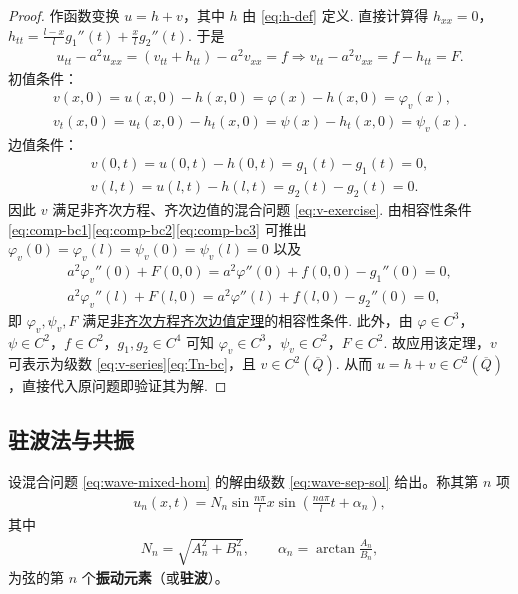 \documentclass[../../main.tex]{subfiles}%
\begin{document}
\begin{proof}
作函数变换 $u=h+v$，其中 $h$ 由 \eqref{eq:h-def} 定义. 直接计算得 $h_{xx}=0$，$h_{tt}=\frac{l-x}{l}g_1''(t)+\frac{x}{l}g_2''(t)$. 于是
\begin{align*}
u_{tt}-a^2u_{xx}=(v_{tt}+h_{tt})-a^2v_{xx}=f
\Longrightarrow v_{tt}-a^2v_{xx}=f-h_{tt}=F.
\end{align*}
初值条件：
\begin{align*}
v(x,0)=u(x,0)-h(x,0)=\varphi(x)-h(x,0)=\varphi_v(x),\\
v_t(x,0)=u_t(x,0)-h_t(x,0)=\psi(x)-h_t(x,0)=\psi_v(x).
\end{align*}
边值条件：
\begin{align*}
v(0,t)=u(0,t)-h(0,t)=g_1(t)-g_1(t)=0,\\
v(l,t)=u(l,t)-h(l,t)=g_2(t)-g_2(t)=0.
\end{align*}
因此 $v$ 满足非齐次方程、齐次边值的混合问题 \eqref{eq:v-exercise}. 由相容性条件 \eqref{eq:comp-bc1}\eqref{eq:comp-bc2}\eqref{eq:comp-bc3} 可推出 $\varphi_v(0)=\varphi_v(l)=\psi_v(0)=\psi_v(l)=0$ 以及
\begin{align*}
a^2\varphi_v''(0)+F(0,0)=a^2\varphi''(0)+f(0,0)-g_1''(0)=0,\\
a^2\varphi_v''(l)+F(l,0)=a^2\varphi''(l)+f(l,0)-g_2''(0)=0,
\end{align*}
即 $\varphi_v,\psi_v,F$ 满足\hyperref[theorem:一维波动方程的混合问题非齐次方程、齐次边值情形的解]{非齐次方程齐次边值定理}的相容性条件. 此外，由 $\varphi\in C^3$，$\psi\in C^2$，$f\in C^2$，$g_1,g_2\in C^4$ 可知 $\varphi_v\in C^3$，$\psi_v\in C^2$，$F\in C^2$. 故应用该定理，$v$ 可表示为级数 \eqref{eq:v-series}\eqref{eq:Tn-bc}，且 $v\in C^2(\overline{Q})$. 从而 $u=h+v\in C^2(\overline{Q})$，直接代入原问题即验证其为解.
\end{proof}



\subsection{驻波法与共振}

\begin{definition}
设混合问题 \eqref{eq:wave-mixed-hom} 的解由级数 \eqref{eq:wave-sep-sol} 给出。称其第 $n$ 项
\begin{align}
u_n(x,t)=N_n\sin\frac{n\pi}{l}x\sin\left(\frac{na\pi}{l}t+\alpha_n\right), \label{eq:standing-wave}
\end{align}
其中
\begin{align*}
N_n=\sqrt{A_n^2+B_n^2},\qquad \alpha_n=\arctan\frac{A_n}{B_n},
\end{align*}
为弦的第 $n$ 个\textbf{振动元素}（或\textbf{驻波}）。
\end{definition}
\end{document}
